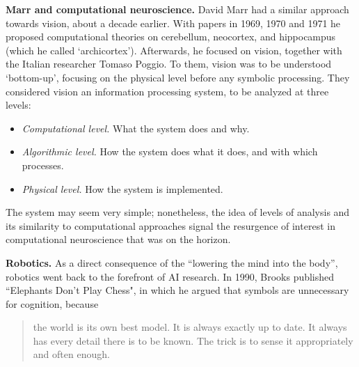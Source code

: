 \documentclass[../main.tex]{subfiles}
\begin{document}
\vspace{4pt}
\textbf{Marr and computational neuroscience.} David Marr had a similar approach towards vision, about a decade earlier. With papers in 1969, 1970 and 1971 he proposed computational theories on cerebellum\cite{marrTheoryCerebellarCortex1969}, neocortex\cite{marrTheoryCerebralNeocortex1970}, and hippocampus (which he called `archicortex')\cite{marrSimpleMemoryTheory1971}. Afterwards, he focused on vision, together with the Italian researcher Tomaso Poggio. To them, vision was to be understood `bottom-up', focusing on the physical level before any symbolic processing. They considered vision an information processing system, to be analyzed at three levels\cite{marrUnderstandingComputationUnderstanding1976}:

\begin{itemize}
    \item \textit{Computational level.} What the system does and why.
    \item \textit{Algorithmic level.} How the system does what it does, and with which processes.
    \item \textit{Physical level.} How the system is implemented.
\end{itemize}

The system may seem very simple; nonetheless, the idea of levels of analysis and its similarity to computational approaches signal the resurgence of interest in computational neuroscience that was on the horizon.

\vspace{4pt}
\textbf{Robotics.} As a direct consequence of the ``lowering the mind into the body'', robotics went back to the forefront of AI research. In 1990, Brooks published ``Elephants Don't Play Chess"\cite{brooksElephantsDonPlay1990}, in which he argued that symbols are unnecessary for cognition, because
\begin{quote}
    the world is its own best model. It is always exactly up to date. It always has every detail there is to be known. The trick is to sense it appropriately and often enough.
\end{quote}
\end{document}
